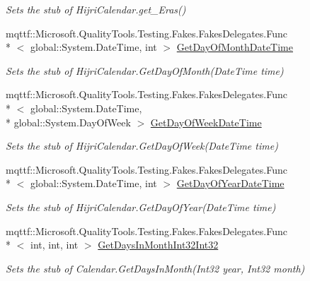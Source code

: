 \begin{DoxyCompactItemize}
\begin{DoxyCompactList}\small\item\em Sets the stub of Hijri\-Calendar.\-get\-\_\-\-Eras()\end{DoxyCompactList}\item 
mqttf\-::\-Microsoft.\-Quality\-Tools.\-Testing.\-Fakes.\-Fakes\-Delegates.\-Func\\*
$<$ global\-::\-System.\-Date\-Time, int $>$ \hyperlink{class_system_1_1_globalization_1_1_fakes_1_1_stub_hijri_calendar_a68e1691a8cfefd7889098463ddcd8e0c}{Get\-Day\-Of\-Month\-Date\-Time}
\begin{DoxyCompactList}\small\item\em Sets the stub of Hijri\-Calendar.\-Get\-Day\-Of\-Month(\-Date\-Time time)\end{DoxyCompactList}\item 
mqttf\-::\-Microsoft.\-Quality\-Tools.\-Testing.\-Fakes.\-Fakes\-Delegates.\-Func\\*
$<$ global\-::\-System.\-Date\-Time, \\*
global\-::\-System.\-Day\-Of\-Week $>$ \hyperlink{class_system_1_1_globalization_1_1_fakes_1_1_stub_hijri_calendar_a60facdffc276cc53670f74f7af1f091c}{Get\-Day\-Of\-Week\-Date\-Time}
\begin{DoxyCompactList}\small\item\em Sets the stub of Hijri\-Calendar.\-Get\-Day\-Of\-Week(\-Date\-Time time)\end{DoxyCompactList}\item 
mqttf\-::\-Microsoft.\-Quality\-Tools.\-Testing.\-Fakes.\-Fakes\-Delegates.\-Func\\*
$<$ global\-::\-System.\-Date\-Time, int $>$ \hyperlink{class_system_1_1_globalization_1_1_fakes_1_1_stub_hijri_calendar_ad31701fbb138bda0510060ed4799187c}{Get\-Day\-Of\-Year\-Date\-Time}
\begin{DoxyCompactList}\small\item\em Sets the stub of Hijri\-Calendar.\-Get\-Day\-Of\-Year(\-Date\-Time time)\end{DoxyCompactList}\item 
mqttf\-::\-Microsoft.\-Quality\-Tools.\-Testing.\-Fakes.\-Fakes\-Delegates.\-Func\\*
$<$ int, int, int $>$ \hyperlink{class_system_1_1_globalization_1_1_fakes_1_1_stub_hijri_calendar_a3b4cdc825393d2ebcc5249359fbb2945}{Get\-Days\-In\-Month\-Int32\-Int32}
\begin{DoxyCompactList}\small\item\em Sets the stub of Calendar.\-Get\-Days\-In\-Month(\-Int32 year, Int32 month)\end{DoxyCompactList}\item 

\end{DoxyCompactItemize}
